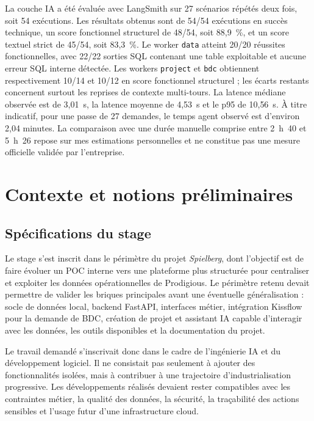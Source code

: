 \documentclass[a4paper,11pt,english,openany]{book}
\begin{document}
La couche IA a été évaluée avec LangSmith sur 27 scénarios répétés deux fois, soit 54 exécutions. Les résultats obtenus sont de 54/54 exécutions en succès technique, un score fonctionnel structurel de 48/54, soit 88{,}9~\%, et un score textuel strict de 45/54, soit 83{,}3~\%. Le worker \texttt{data} atteint 20/20 réussites fonctionnelles, avec 22/22 sorties SQL contenant une table exploitable et aucune erreur SQL interne détectée. Les workers \texttt{project} et \texttt{bdc} obtiennent respectivement 10/14 et 10/12 en score fonctionnel structurel ; les écarts restants concernent surtout les reprises de contexte multi-tours. La latence médiane observée est de 3{,}01~s, la latence moyenne de 4{,}53~s et le p95 de 10{,}56~s. À titre indicatif, pour une passe de 27 demandes, le temps agent observé est d'environ 2{,}04 minutes. La comparaison avec une durée manuelle comprise entre 2~h~40 et 5~h~26 repose sur mes estimations personnelles et ne constitue pas une mesure officielle validée par l'entreprise.
\chapter{Contexte et notions préliminaires}

\section{Spécifications du stage}
Le stage s'est inscrit dans le périmètre du projet \textit{Spielberg}, dont l'objectif est de faire évoluer un POC interne vers une plateforme plus structurée pour centraliser et exploiter les données opérationnelles de Prodigious. Le périmètre retenu devait permettre de valider les briques principales avant une éventuelle généralisation : socle de données local, backend FastAPI, interfaces métier, intégration Kissflow pour la demande de BDC, création de projet et assistant IA capable d'interagir avec les données, les outils disponibles et la documentation du projet.

Le travail demandé s'inscrivait donc dans le cadre de l'ingénierie IA et du développement logiciel. Il ne consistait pas seulement à ajouter des fonctionnalités isolées, mais à contribuer à une trajectoire d'industrialisation progressive. Les développements réalisés devaient rester compatibles avec les contraintes métier, la qualité des données, la sécurité, la traçabilité des actions sensibles et l'usage futur d'une infrastructure cloud.
\end{document}
